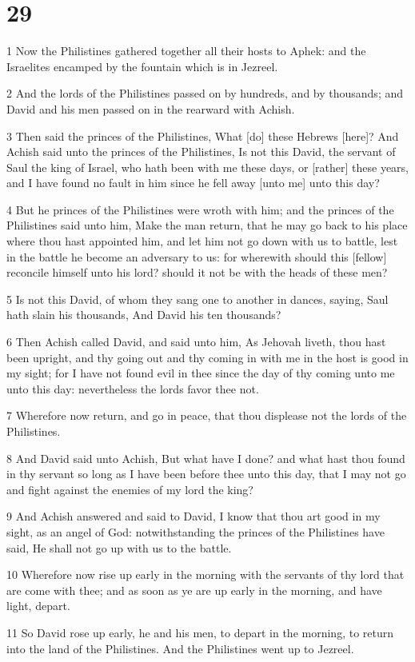 \chapter{29}

\par 1 Now the Philistines gathered together all their hosts to Aphek: and the Israelites encamped by the fountain which is in Jezreel.
\par 2 And the lords of the Philistines passed on by hundreds, and by thousands; and David and his men passed on in the rearward with Achish.
\par 3 Then said the princes of the Philistines, What [do] these Hebrews [here]? And Achish said unto the princes of the Philistines, Is not this David, the servant of Saul the king of Israel, who hath been with me these days, or [rather] these years, and I have found no fault in him since he fell away [unto me] unto this day?
\par 4 But he princes of the Philistines were wroth with him; and the princes of the Philistines said unto him, Make the man return, that he may go back to his place where thou hast appointed him, and let him not go down with us to battle, lest in the battle he become an adversary to us: for wherewith should this [fellow] reconcile himself unto his lord? should it not be with the heads of these men?
\par 5 Is not this David, of whom they sang one to another in dances, saying, Saul hath slain his thousands, And David his ten thousands?
\par 6 Then Achish called David, and said unto him, As Jehovah liveth, thou hast been upright, and thy going out and thy coming in with me in the host is good in my sight; for I have not found evil in thee since the day of thy coming unto me unto this day: nevertheless the lords favor thee not.
\par 7 Wherefore now return, and go in peace, that thou displease not the lords of the Philistines.
\par 8 And David said unto Achish, But what have I done? and what hast thou found in thy servant so long as I have been before thee unto this day, that I may not go and fight against the enemies of my lord the king?
\par 9 And Achish answered and said to David, I know that thou art good in my sight, as an angel of God: notwithstanding the princes of the Philistines have said, He shall not go up with us to the battle.
\par 10 Wherefore now rise up early in the morning with the servants of thy lord that are come with thee; and as soon as ye are up early in the morning, and have light, depart.
\par 11 So David rose up early, he and his men, to depart in the morning, to return into the land of the Philistines. And the Philistines went up to Jezreel.

